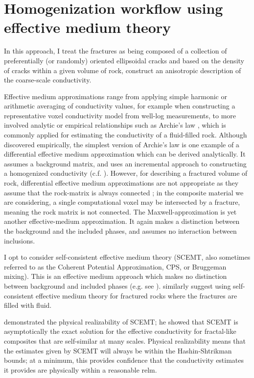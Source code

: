 \section{Homogenization workflow using effective medium theory}

In this approach, I treat the fractures as being composed of a collection of preferentially (or randomly) oriented ellipsoidal cracks and based on the density of cracks within a given volume of rock, construct an anisotropic description of the coarse-scale conductivity.

Effective medium approximations range from applying simple harmonic or arithmetic averaging of conductivity values, for example when constructing a representative voxel conductivity model from well-log measurements, to more involved analytic or empirical relationships such as Archie’s law \citep{Archie1942}, which is commonly applied for estimating the conductivity of a fluid-filled rock. Although discovered empirically, the simplest version of Archie’s law is one example of a differential effective medium approximation which can be derived analytically. It assumes a background matrix, and uses an incremental approach to constructing a homogenized conductivity (c.f. \cite{Torquato2002, Milton2002}). However, for describing a fractured volume of rock, differential effective medium approximations are not appropriate as they assume that the rock-matrix is always connected \citep{Torquato2002}; in the composite material we are considering, a single computational voxel may be intersected by a fracture, meaning the rock matrix is not connected. The Maxwell-approximation \citep{Maxwell1873} is yet another effective-medium approximation. It again makes a distinction between the background and the included phases, and assumes no interaction between inclusions.

I opt to consider self-consistent effective medium theory (SCEMT, also sometimes referred to as the Coherent Potential Approximation, CPS, or Bruggeman mixing). This is an effective medium approach which makes no distinction between background and included phases (e.g. see \cite{Torquato2002}). \cite{Berryman2013} similarly suggest using self-consistent effective medium theory for fractured rocks where the fractures are filled with fluid.

\cite{Milton1985} demonstrated the physical realizability of SCEMT; he showed that SCEMT is asymptotically the exact solution for the effective conductivity for fractal-like composites that are self-similar at many scales. Physical realizability means that the estimates given by SCEMT will always be within the Hashin-Shtrikman bounds; at a minimum, this provides confidence that the conductivity estimates it provides are physically within a reasonable relm.

